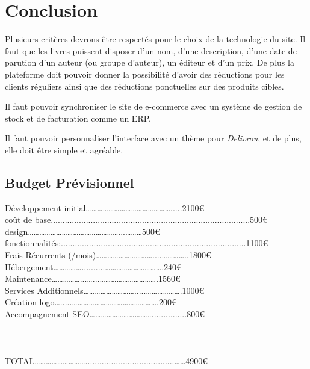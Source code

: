 \documentclass[a4paper,12pt]{report}
\begin{document}
\chapter{Conclusion}
Plusieurs critères devrons être respectés pour le choix de la technologie du
site.
Il faut que les livres puissent disposer d'un nom, d'une description, d'une
date de parution d'un auteur (ou groupe d'auteur), un éditeur et d'un prix.
De plus la plateforme doit pouvoir donner la possibilité d'avoir des
réductions pour les clients réguliers ainsi que des réductions ponctuelles sur
des produits cibles.

Il faut pouvoir synchroniser le site de e-commerce avec un système de gestion
de stock et de facturation comme un ERP.

Il faut pouvoir personnaliser l'interface avec un thème pour
\textit{Delivrou}, et de plus, elle doit être simple et agréable.

\newpage
\section{Budget Prévisionnel}
Développement initial……………………………………….....2100\euro  \\
\hangindent=1.5cm coût de base.....................................................................................500\euro  \\
design…………………………………………...………500\euro  \\
fonctionnalités:...............................................................................1100\euro  \\

Frais Récurrents (/mois)…………………………....…………..1800\euro  \\
\hangindent=1.5cm Hébergement……………..........………………………….240\euro  \\
Maintenance……………...…...………………………….1560\euro  \\

Services Additionnels……………………….....……………….1000\euro  \\
\hangindent=1.5cm    Création logo….....……………………………………….200\euro  \\
    Accompagnement SEO……………………………...............800\euro  \\
\\\\\\
TOTAL………………………......................................……4900\euro \\
\end{document}
